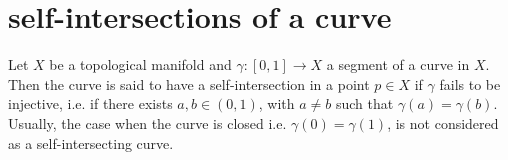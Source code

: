 \documentclass[12pt]{article}
\newcounter{123listctr}
\newcounter{123listcolonstylectr}
\begin{document}
\section*{self-intersections of a curve}
Let $X $ be a topological manifold and $\gamma:[0,1]\rightarrow X$ a segment of a curve in $X $.\\

Then the curve is said to have a self-intersection in a point $p\in X$ if $\gamma$ fails to be injective, i.e. if there exists $a,b\in (0,1)$, with $a \neq b$ such that $\gamma(a)=\gamma(b)$.
Usually, the case when the curve is closed i.e. $\gamma(0)=\gamma(1)$, is not considered as a self-intersecting curve.
\end{document}
